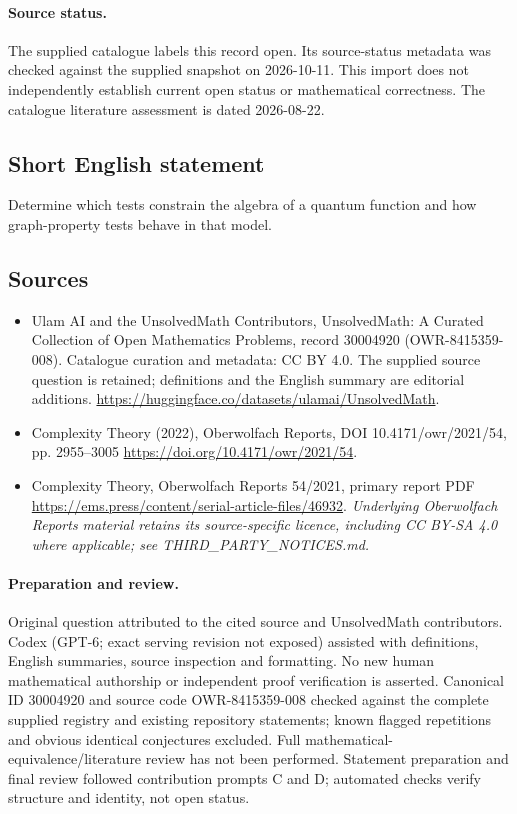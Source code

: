 \documentclass[11pt]{article}
\begin{document}
\paragraph{Source status.}
The supplied catalogue labels this record open. Its source-status metadata was checked against the supplied snapshot on 2026-10-11. This import does not independently establish current open status or mathematical correctness. The catalogue literature assessment is dated 2026-08-22.
\subsection{Short English statement}
Determine which tests constrain the algebra of a quantum function and how graph-property tests behave in that model.
\subsection{Sources}
\begin{itemize}
\item[\hypertarget{source:30004920:1}{S1}] Ulam AI and the UnsolvedMath Contributors, UnsolvedMath: A Curated Collection of Open Mathematics Problems, record 30004920 (OWR-8415359-008). Catalogue curation and metadata: CC BY 4.0. The supplied source question is retained; definitions and the English summary are editorial additions.
\url{https://huggingface.co/datasets/ulamai/UnsolvedMath}.
\item[\hypertarget{source:30004920:2}{S2}] Complexity Theory (2022), Oberwolfach Reports, DOI 10.4171/owr/2021/54, pp. 2955--3005
\url{https://doi.org/10.4171/owr/2021/54}.
\item[\hypertarget{source:30004920:3}{S3}] Complexity Theory, Oberwolfach Reports 54/2021, primary report PDF
\url{https://ems.press/content/serial-article-files/46932}.
\textit{Underlying Oberwolfach Reports material retains its source-specific licence, including CC BY-SA 4.0 where applicable; see THIRD\_PARTY\_NOTICES.md.}
\end{itemize}
\paragraph{Preparation and review.}
Original question attributed to the cited source and UnsolvedMath contributors. Codex (GPT-6; exact serving revision not exposed) assisted with definitions, English summaries, source inspection and formatting. No new human mathematical authorship or independent proof verification is asserted. Canonical ID 30004920 and source code OWR-8415359-008 checked against the complete supplied registry and existing repository statements; known flagged repetitions and obvious identical conjectures excluded. Full mathematical-equivalence/literature review has not been performed. Statement preparation and final review followed contribution prompts C and D; automated checks verify structure and identity, not open status.
\label{end:30004920}
\end{document}
